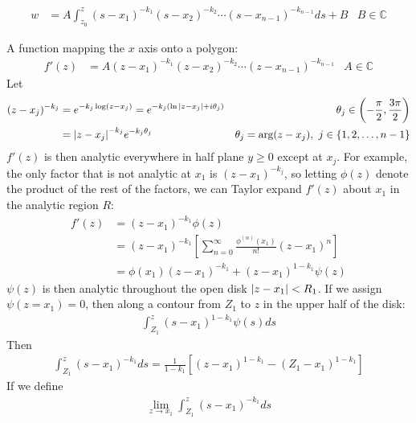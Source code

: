 \documentclass[12pt, english]{book}
\makeatletter
\renewenvironment{proof}[1][\proofname]{\par
	\pushQED{\qed}%
	\normalfont \topsep6\p@\@plus6\p@\relax
	\list{}{%
		\settowidth{\leftmargin}{\itshape\proofname:\hskip\labelsep}%
		\setlength{\labelwidth}{0pt}%
		\setlength{\itemindent}{-\leftmargin}%
		}%
	\item[\hskip\labelsep\itshape#1\@addpunct{:}]\ignorespaces
	}{\popQED\endlist\@endpefalse}
\makeatother
\begin{document}
	\begin{theorem}
		\label{Schwarz-Christoffel Transformations Theorem - Complex}
		\begin{align*}
			w 
			&= A \int_{z_0}^{z} (s-x_1)^{-k_1} (s-x_2)^{-k_2} \cdots (s-x_{n-1})^{-k_{n-1}} ds + B &
			B \in \mathbb{C}
		\end{align*}
	\end{theorem}
	\begin{proof}
		A function mapping the \(x\) axis onto a polygon:
		\begin{align*}
			f'(z) &= A(z - x_1)^{-k_1} (z-x_2)^{-k_2} \cdots (z-x_{n-1})^{-k_{n-1}} &
			A \in \mathbb{C}
		\end{align*}
		Let 
		\begin{align*}
			(z-x_j)^{-k_j} 
			&= e^{-k_j \log(z-x_j)} = e^{-k_j(\ln\abs{z-x_j} + i\theta_j)} &
				\theta_j \in \left(-\frac{\pi}{2}, \frac{3\pi}{2}\right) \\
			&= \abs{z - x_j}^{-k_j}	e^{-k_j \theta_j} &
				\theta_j = \arg(z - x_j), \ j \in \{1, 2, \ldots, n-1\}
		\end{align*}
		\(f'(z)\) is then analytic everywhere in half plane \(y\geq 0\) except at \(x_j\). For example, the only factor that is not analytic at \(x_1\) is \((z - x_1)^{-k_j}\), so letting \(\phi(z)\) denote the product of the rest of the factors, we can Taylor expand \(f'(z)\) about \(x_1\) in the analytic region \(R\):
		\begin{align*}
			f'(z) 
			&= (z-x_1)^{-k_1} \phi(z) \\
			&= (z-x_1)^{-k_1} \left[ \sum_{n=0}^{\infty} \frac{\phi^{(n)}(x_1)}{n!}(z-x_1)^n\right] \\
			&= \phi(x_1)(z-x_1)^{-k_1} + (z-x_1)^{1-k_1} \psi(z)
		\end{align*}
		\(\psi(z)\) is then analytic throughout the open disk \(\abs{z - x_1} < R_1\). If we assign \(\psi(z = x_1) = 0\), then along a contour from \(Z_1\) to \(z\) in the upper half of the disk:
		\begin{align*}
			\int_{Z_1}^{z} (s-x_1)^{1-k_1} \psi(s) ds
		\end{align*}
		Then 
		\begin{align*}
			\int_{Z_1}^{z} (s-x_1)^{-k_1} ds 
			= \frac{1}{1-k_1} \left[(z-x_1)^{1-k_1} - (Z_1 - x_1)^{1-k_1}\right]
		\end{align*}
		If we define
		\begin{align*}
			\lim_{z\rightarrow x_1} \int_{Z_1}^{z} (s-x_1)^{-k_1} ds 

\end{align*}
\end{proof}
\end{document}
